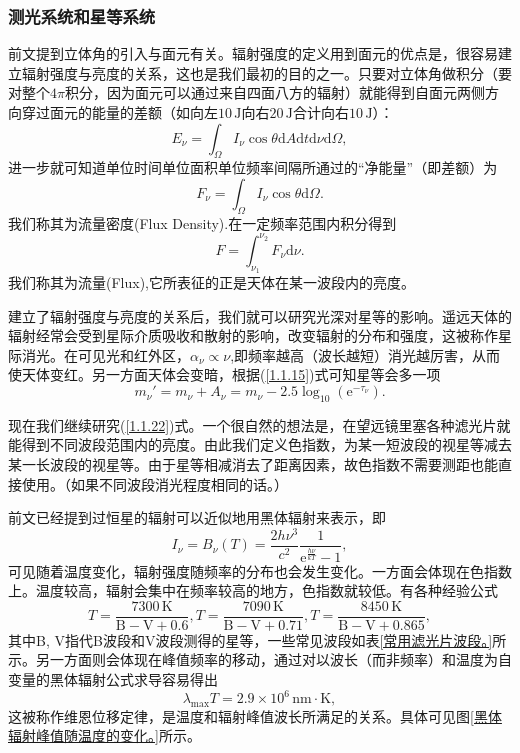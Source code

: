 \documentclass[../天体物理基础.tex]{subfiles}
\begin{document}
\subsubsection{测光系统和星等系统}
前文提到立体角的引入与面元有关。辐射强度的定义用到面元的优点是，很容易建立辐射强度与亮度的关系，这也是我们最初的目的之一。只要对立体角做积分（要对整个$4\pi$积分，因为面元可以通过来自四面八方的辐射）就能得到自面元两侧方向穿过面元的能量的差额（如向左$10\,\mathrm{J}$向右$20\,\mathrm{J}$合计向右$10\,\mathrm{J}$）：
\begin{equation}
E_{\nu}=\int_{\Omega}I_{\nu}\cos\theta\mathrm{d}A\mathrm{d}t\mathrm{d}\nu\mathrm{d}\Omega,
\end{equation}
进一步就可知道单位时间单位面积单位频率间隔所通过的“净能量”（即差额）为
\begin{equation}
F_{\nu}=\int_{\Omega}I_{\nu}\cos\theta\mathrm{d}\Omega.
\end{equation}
我们称其为流量密度(Flux Density).在一定频率范围内积分得到
\begin{equation}
F=\int_{\nu_{1}}^{\nu_{2}}F_{\nu}\mathrm{d}\nu.\label{1.1.22}
\end{equation}
我们称其为流量(Flux),它所表征的正是天体在某一波段内的亮度。

建立了辐射强度与亮度的关系后，我们就可以研究光深对星等的影响。遥远天体的辐射经常会受到星际介质吸收和散射的影响，改变辐射的分布和强度，这被称作星际消光。在可见光和红外区，$\alpha_{\nu}\propto{}\nu$,即频率越高（波长越短）消光越厉害，从而使天体变红。另一方面天体会变暗，根据(\ref{1.1.15})式可知星等会多一项
\begin{equation}
m_{\nu}'=m_{\nu}+A_{\nu}=m_{\nu}-2.5\log_{10}\left(\mathrm{e}^{-\tau_{\nu}}\right).
\end{equation}

现在我们继续研究(\ref{1.1.22})式。一个很自然的想法是，在望远镜里塞各种滤光片就能得到不同波段范围内的亮度。由此我们定义色指数，为某一短波段的视星等减去某一长波段的视星等。由于星等相减消去了距离因素，故色指数不需要测距也能直接使用。（如果不同波段消光程度相同的话。）

前文已经提到过恒星的辐射可以近似地用黑体辐射来表示，即
\begin{equation}
I_{\nu}=B_{\nu}\left(T\right)=\frac{2h\nu^{3}}{c^{2}}\frac{1}{\mathrm{e}^{\frac{h\nu}{kT}}-1},
\end{equation}
可见随着温度变化，辐射强度随频率的分布也会发生变化。一方面会体现在色指数上。温度较高，辐射会集中在频率较高的地方，色指数就较低。有各种经验公式
\begin{equation}
T=\frac{7300\,\mathrm{K}}{\mathrm{B-V}+0.6},T=\frac{7090\,\mathrm{K}}{\mathrm{B-V}+0.71},T=\frac{8450\,\mathrm{K}}{\mathrm{B-V}+0.865},
\end{equation}
其中B, V指代B波段和V波段测得的星等，一些常见波段如表\ref{常用滤光片波段。}所示。另一方面则会体现在峰值频率的移动，通过对以波长（而非频率）和温度为自变量的黑体辐射公式求导容易得出
\begin{equation}
\lambda_{\max}T=2.9\times10^{6}\,\mathrm{nm\cdot K},
\end{equation}
这被称作维恩位移定律，是温度和辐射峰值波长所满足的关系。具体可见图\ref{黑体辐射峰值随温度的变化。}所示。
\end{document}
